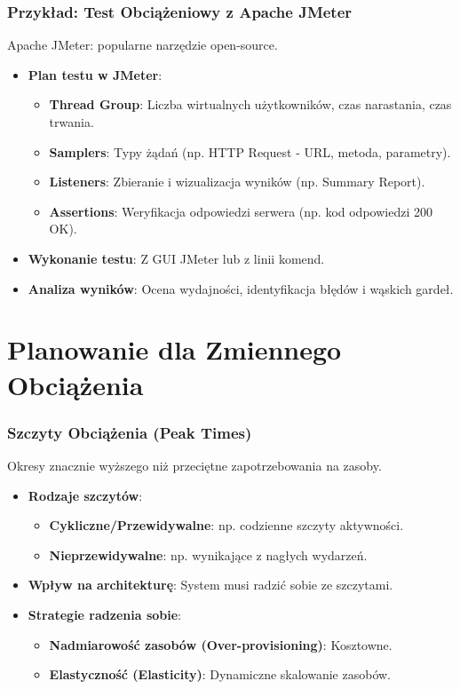 \documentclass[aspectratio=169,xcolor=table]{beamer}
\begin{document}
\begin{frame}
  \frametitle{Przykład: Test Obciążeniowy z Apache JMeter}
  Apache JMeter: popularne narzędzie open-source.
  \begin{itemize}
    \item \textbf{Plan testu w JMeter}:
        \begin{itemize}
            \item \textbf{Thread Group}: Liczba wirtualnych użytkowników, czas narastania, czas trwania.
            \item \textbf{Samplers}: Typy żądań (np. HTTP Request - URL, metoda, parametry).
            \item \textbf{Listeners}: Zbieranie i wizualizacja wyników (np. Summary Report).
            \item \textbf{Assertions}: Weryfikacja odpowiedzi serwera (np. kod odpowiedzi 200 OK).
        \end{itemize}
    \item \textbf{Wykonanie testu}: Z GUI JMeter lub z linii komend.
    \item \textbf{Analiza wyników}: Ocena wydajności, identyfikacja błędów i wąskich gardeł.
  \end{itemize}
\end{frame}

\section{Planowanie dla Zmiennego Obciążenia}

\begin{frame}
  \frametitle{Szczyty Obciążenia (Peak Times)}
  Okresy znacznie wyższego niż przeciętne zapotrzebowania na zasoby.
  \begin{itemize}
    \item \textbf{Rodzaje szczytów}:
        \begin{itemize}
            \item \textbf{Cykliczne/Przewidywalne}: np. codzienne szczyty aktywności.
            \item \textbf{Nieprzewidywalne}: np. wynikające z nagłych wydarzeń.
        \end{itemize}
    \item \textbf{Wpływ na architekturę}: System musi radzić sobie ze szczytami.
    \item \textbf{Strategie radzenia sobie}:
        \begin{itemize}
            \item \textbf{Nadmiarowość zasobów (Over-provisioning)}: Kosztowne.
            \item \textbf{Elastyczność (Elasticity)}: Dynamiczne skalowanie zasobów.
        \end{itemize}
  \end{itemize}
\end{frame}
\end{document}
